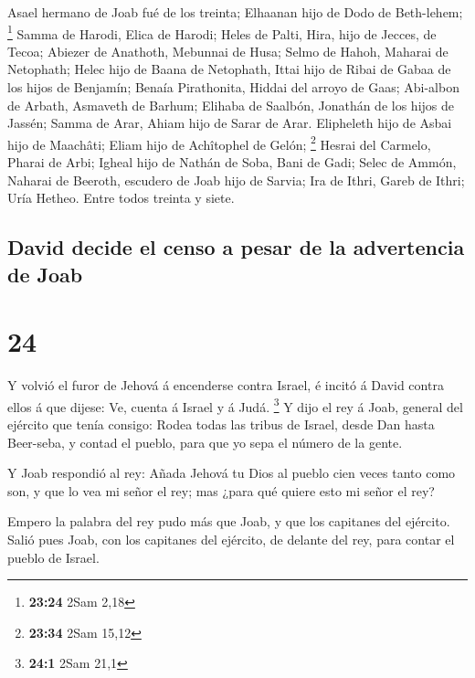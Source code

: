  Asael hermano de Joab fué de los treinta; Elhaanan hijo
de Dodo de Beth-lehem; \footnote{\textbf{23:24} 2Sam 2,18}
 Samma de Harodi, Elica de Harodi;  Heles
de Palti, Hira, hijo de Jecces, de Tecoa;  Abiezer de
Anathoth, Mebunnai de Husa;  Selmo de Hahoh, Maharai de
Netophath;  Helec hijo de Baana de Netophath, Ittai hijo
de Ribai de Gabaa de los hijos de Benjamín;  Benaía
Pirathonita, Hiddai del arroyo de Gaas;  Abi-albon de
Arbath, Asmaveth de Barhum;  Elihaba de Saalbón, Jonathán
de los hijos de Jassén;  Samma de Arar, Ahiam hijo de
Sarar de Arar.  Elipheleth hijo de Asbai hijo de
Maachâti; Eliam hijo de Achîtophel de Gelón; \footnote{\textbf{23:34}
  2Sam 15,12}  Hesrai del Carmelo, Pharai de Arbi;
 Igheal hijo de Nathán de Soba, Bani de Gadi;
 Selec de Ammón, Naharai de Beeroth, escudero de Joab
hijo de Sarvia;  Ira de Ithri, Gareb de Ithri;
 Uría Hetheo. Entre todos treinta y siete.

\hypertarget{david-decide-el-censo-a-pesar-de-la-advertencia-de-joab}{%
\subsection{David decide el censo a pesar de la advertencia de
Joab}\label{david-decide-el-censo-a-pesar-de-la-advertencia-de-joab}}

\hypertarget{section-23}{%
\section{24}\label{section-23}}

 Y volvió el furor de Jehová á encenderse contra Israel, é
incitó á David contra ellos á que dijese: Ve, cuenta á Israel y á Judá.
\footnote{\textbf{24:1} 2Sam 21,1}  Y dijo el rey á Joab,
general del ejército que tenía consigo: Rodea todas las tribus de
Israel, desde Dan hasta Beer-seba, y contad el pueblo, para que yo sepa
el número de la gente.

 Y Joab respondió al rey: Añada Jehová tu Dios al pueblo
cien veces tanto como son, y que lo vea mi señor el rey; mas ¿para qué
quiere esto mi señor el rey?

 Empero la palabra del rey pudo más que Joab, y que los
capitanes del ejército. Salió pues Joab, con los capitanes del ejército,
de delante del rey, para contar el pueblo de Israel.

